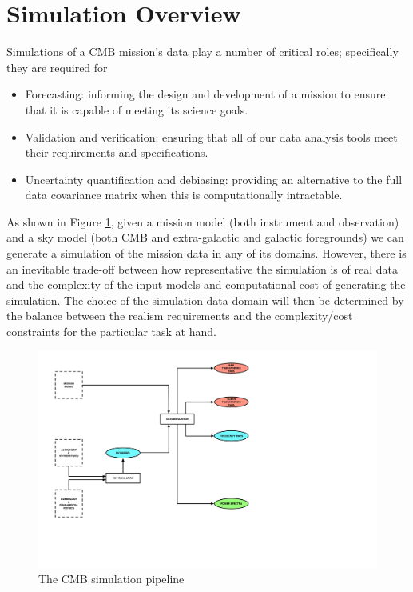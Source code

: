 

\newpage



\newpage



\newpage

\section{Simulation Overview}
Simulations of a CMB mission's data play a number of critical roles; specifically they are required for
\begin{itemize}
\item Forecasting: informing the design and development of a mission to ensure that it is capable of meeting its science goals.
\item Validation and verification: ensuring that all of our data analysis tools meet their requirements and specifications.
\item Uncertainty quantification and debiasing: providing an alternative to the full data covariance matrix when this is computationally intractable.
\end{itemize}

As shown in Figure \ref{fig_sim}, given a mission model (both instrument and observation) and a sky model (both CMB and extra-galactic and galactic foregrounds) we can generate a simulation of the mission data in any of its domains. However, there is an inevitable trade-off between how representative the simulation is of real data and the complexity of the input models and computational cost of generating the simulation. The choice of the simulation data domain will then be determined by the balance between the realism requirements and the complexity/cost constraints for the particular task at hand.

\begin{figure}[htbp]
\centering
\includegraphics[width=1\textwidth]{Analysis/sim}
\caption{The CMB simulation pipeline}
\label{fig_sim}
\end{figure}

